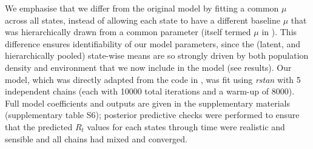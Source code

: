 \documentclass[12pt,english,a4paper]{article}
\begin{document}
We emphasise that we differ from the original model by fitting a common $\mu$ across all states, instead of allowing each state to have a different baseline $\mu$ that was hierarchically drawn from a common parameter (itself termed $\mu$ in \citet{Unwin2020a}). This difference ensures identifiability of our model parameters, since the (latent, and hierarchically pooled) state-wise means are so strongly driven by both population density and environment that we now include in the model (see results). Our model, which was directly adapted from the code in \citet{Unwin2020a}, was fit using \emph{rstan} \cite{rstan2020} with 5 independent chains (each with 10000 total iterations and a warm-up of 8000). Full model coefficients and outputs are given in the supplementary materials (supplementary table S6); posterior predictive checks were performed to ensure that the predicted $R_t$ values for each states through time were realistic and sensible and all chains had mixed and converged.

\clearpage





\end{document}

